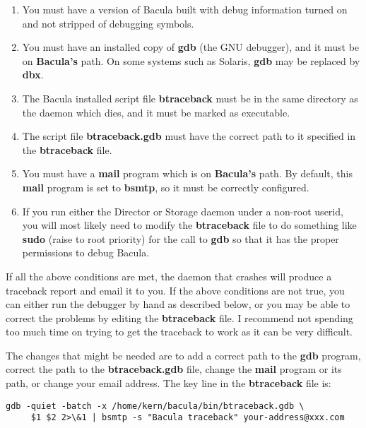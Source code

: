 \begin{enumerate}
\item You must have a version of Bacula built with debug information turned
   on and not stripped of debugging symbols.

\item You must have an installed copy of {\bf gdb} (the GNU debugger),  and it
   must be on {\bf Bacula's} path. On some systems such as Solaris, {\bf
   gdb} may be replaced by {\bf dbx}.

\item The Bacula installed script file {\bf btraceback} must  be in the same
   directory as the daemon which dies, and it must  be marked as executable.  

\item The script file {\bf btraceback.gdb} must  have the correct  path to it
   specified in the {\bf btraceback} file.  

\item You must have a {\bf mail} program which is on {\bf Bacula's}  path. 
   By default, this {\bf mail} program is set to {\bf bsmtp}, so it must
   be correctly configured.

\item If you run either the Director or Storage daemon under a non-root
   userid, you will most likely need to modify the {\bf btraceback} file
   to do something like {\bf sudo} (raise to root priority) for the       
   call to {\bf gdb} so that it has the proper permissions to debug
   Bacula.
\end{enumerate}

If all the above conditions are met, the daemon that crashes will produce a
traceback report and email it to you. If the above conditions are not true,
you can either run the debugger by hand as described below, or you may be able
to correct the problems by editing the {\bf btraceback} file. I recommend not
spending too much time on trying to get the traceback to work as it can be
very difficult. 

The changes that might be needed are to add a correct path to the {\bf gdb}
program, correct the path to the {\bf btraceback.gdb} file, change the {\bf
mail} program or its path, or change your email address. The key line in the
{\bf btraceback} file is: 

\footnotesize
\begin{verbatim}
gdb -quiet -batch -x /home/kern/bacula/bin/btraceback.gdb \
     $1 $2 2>\&1 | bsmtp -s "Bacula traceback" your-address@xxx.com
\end{verbatim}
\normalsize

